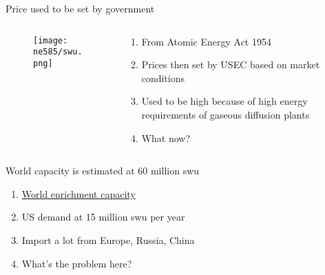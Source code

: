 \documentclass[aspectratio=1610,pdftex,dvipsnames,compress,xcolor={dvipsnames}]{beamer}
\newcommand{\acs}{\acrshort} %
\begin{document}
\begin{frame}{Price used to be set by government}
    \begin{columns}[t]

        \begin{column}{0.55\textwidth}
            \begin{figure}
                \centering
                \texttt{[image: ne585/swu.png]}
            \end{figure}
        \end{column}

        \begin{column}{0.45\textwidth}
            \begin{enumerate}[series=outerlist,topsep=0pt,itemsep=11pt,leftmargin=*,label=(\arabic*)]
                \item[]From Atomic Energy Act 1954
                \item[]Prices then set by USEC based on market conditions
                \item[]Used to be high because of high energy requirements of gaseous diffusion plants
                \item[]What now?
            \end{enumerate}
        \end{column}

    \end{columns}
\end{frame}


\begin{frame}{World capacity is estimated at 60 million \acs{swu}}
    \begin{enumerate}[topsep=0pt,itemsep=21pt,leftmargin=*,label=(\arabic*)]
        \item[]\href{http://www.world-nuclear.org/information-library/nuclear-fuel-cycle/conversion-enrichment-and-fabrication/uranium-enrichment.aspx}{World enrichment capacity}
        \item[]US demand at 15 million \acs{swu} per year
        \item[]Import a lot from Europe, Russia, China
        \item[]What's the problem here?
    \end{enumerate}
\end{frame}


\end{document}

